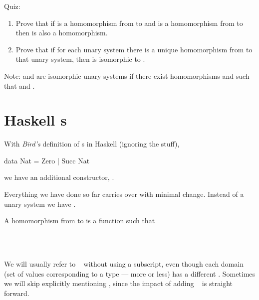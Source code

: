 \documentclass{seminar}
\newcommand{\NAT}{\textcolor{MathColor}{\ensuremath{\mathbb{N}}}}
\begin{document}
\begin{slide}
\newslide

Quiz:  \textcolor{QuoteColor}{
\begin{enumerate}
\item Prove that if  is a homomorphism from
 to  and
 is a homomorphism from
 to  then
 is also a homomorphism.
\item Prove that if for each unary system
there is a unique homomorphism from
 to that unary system, then  is isomorphic to
\tm{(\NAT,0,succ)}.
\end{enumerate}}

Note:  and \tm{(\NAT,0,succ)} are isomorphic unary systems if
there exist homomorphisms \tm{g: S \rarrow \NAT} and
\tm{h: \NAT \rarrow S} such that \tm{g \circ h = id_{\NAT}}
and .

\newslide

\section{Haskell s}

With \textit{Bird's} definition of s in Haskell (ignoring the
 stuff),

\begin{code}
data Nat = Zero | Succ Nat
\end{code}

we have an additional constructor, \bottom.

Everything we have done so far carries over with minimal change.  Instead of
a unary system we have .

A homomorphism
from 
to  is a function 
such that

\begin{codenott}
\\
\\
\end{codenott}

\newpage

We will usually refer to \bottom~ without using a subscript, even though each
domain (set of values corresponding to a type --- more or less) has a
different \bottom.  Sometimes we will skip explicitly mentioning \bottom,
since the impact of adding \bottom ~ is straight forward.


\end{slide}
\end{document}
